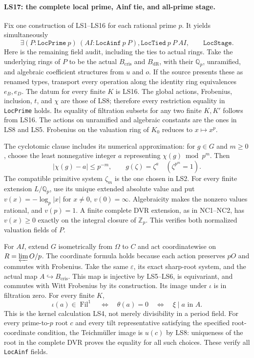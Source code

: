 \paragraph{LS17: the complete local prime, Ainf tie, and all-prime stage.}
Fix one construction of LS1--LS16 for each rational prime $p$.
It yields simultaneously
\[
 \exists(P:\texttt{LocPrime}\ p)\ (AI:\texttt{LocAinf}\ p\ P),
                 \texttt{LocTied}\ p\ P\ AI,\qquad
                 \texttt{LocStage}.                         \tag{LS.39}
\]
Here is the remaining field audit, including the ties to actual
rings. Take the underlying rings of $P$ to be the actual
$B_{\mathrm{cris}}$ and $B_{\mathrm{dR}}$, with their
$\mathbb Q_p$, unramified, and algebraic coefficient structures
from $u$ and $o$. If the source presents these as renamed types,
transport every operation along the identity ring equivalences
$e_B,e_D$. The datum for every finite $K$ is LS16.
The global actions, Frobenius, inclusion, $t$, and $\chi$ are
those of LS8; therefore every restriction equality in
\texttt{LocPrime} holds. Its equality of filtration subsets for
any two finite $K,K'$ follows from LS16. The actions on
unramified and algebraic constants are the ones in LS8 and LS5.
Frobenius on the valuation ring of $K_0$ reduces to $x\mapsto x^p$.

The cyclotomic clause includes its numerical approximation:
for $g\in G$ and $m\ge0$, choose the least nonnegative integer
$a$ representing $\chi(g)\bmod p^m$. Then
\[
 |\chi(g)-a|\le p^{-m},\qquad g(\zeta)=\zeta^a
                   \quad(\zeta^{p^m}=1).                  \tag{LS.40}
\]
The compatible primitive system $\zeta_m$ is the one chosen in
LS2. For every finite extension $L/\mathbb Q_p$, use its unique
extended absolute value and put $v(x)=-\log_p|x|$ for $x\ne0$,
$v(0)=\infty$. Algebraicity makes the nonzero values rational,
and $v(p)=1$. A finite complete DVR extension, as in NC1--NC2,
has $v(x)\ge0$ exactly on the integral closure of $\mathbb Z_p$.
This verifies both normalized valuation fields of $P$.

For $AI$, extend $G$ isometrically from $\Omega$ to $C$ and
act coordinatewise on $R=\varprojlim O/p$. The coordinate
formula holds because each action preserves $pO$ and commutes
with Frobenius. Take the same $\varepsilon$, its exact sharp-root
system, and the actual map $A\hookrightarrow B_{\mathrm{cris}}$.
This map is injective by LS5--LS6, is equivariant, and commutes
with Witt Frobenius by its construction. Its image under
$\iota$ is in filtration zero. For every finite $K$,
\[
 \iota(a)\in\operatorname{Fil}^1
      \quad\Longleftrightarrow\quad\theta(a)=0
      \quad\Longleftrightarrow\quad\xi\mid a\text{ in }A.
                                                               \tag{LS.41}
\]
This is the kernel calculation LS4, not merely divisibility in
a period field. For every prime-to-$p$ root $c$ and every tilt
representative satisfying the specified root-coordinate condition,
the Teichm\"uller image is $u(c)$ by LS8: uniqueness of the
root in the complete DVR proves the equality for all such choices.
These verify all \texttt{LocAinf} fields.

